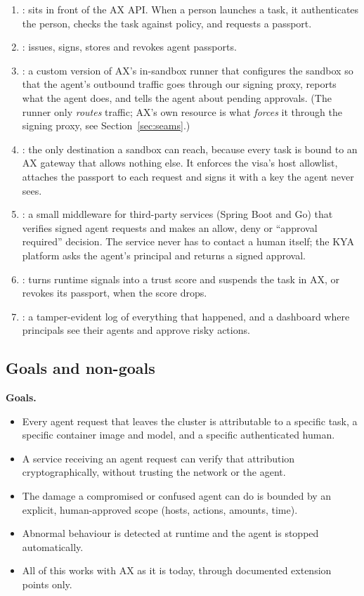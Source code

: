 \begin{enumerate}
  \item {}: sits in front of the AX API. When a person launches a task, it authenticates the person, checks the task against policy, and requests a passport.
  \item {}: issues, signs, stores and revokes agent passports.
  \item {}: a custom version of AX's in-sandbox runner that configures the sandbox so that the agent's outbound traffic goes through our signing proxy, reports what the agent does, and tells the agent about pending approvals. (The runner only \emph{routes} traffic; AX's own  resource is what \emph{forces} it through the signing proxy, see Section~\ref{sec:seams}.)
  \item {}: the only destination a sandbox can reach, because every task is bound to an AX gateway that allows nothing else. It enforces the visa's host allowlist, attaches the passport to each request and signs it with a key the agent never sees.
  \item {}: a small middleware for third-party services (Spring Boot and Go) that verifies signed agent requests and makes an allow, deny or ``approval required'' decision. The service never has to contact a human itself; the KYA platform asks the agent's principal and returns a signed approval.
  \item {}: turns runtime signals into a trust score and suspends the task in AX, or revokes its passport, when the score drops.
  \item {}: a tamper-evident log of everything that happened, and a dashboard where principals see their agents and approve risky actions.
\end{enumerate}

\subsection{Goals and non-goals}

\textbf{Goals.}
\begin{itemize}
  \item Every agent request that leaves the cluster is attributable to a specific task, a specific container image and model, and a specific authenticated human.
  \item A service receiving an agent request can verify that attribution cryptographically, without trusting the network or the agent.
  \item The damage a compromised or confused agent can do is bounded by an explicit, human-approved scope (hosts, actions, amounts, time).
  \item Abnormal behaviour is detected at runtime and the agent is stopped automatically.
  \item All of this works with AX as it is today, through documented extension points only.
\end{itemize}

